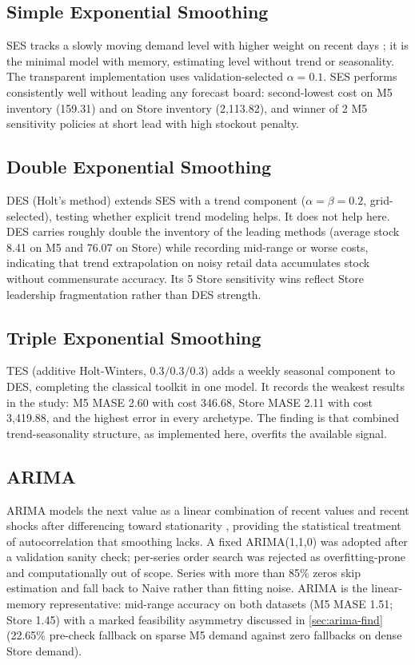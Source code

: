 \subsection{Simple Exponential Smoothing}
\label{sec:m-ses}
SES tracks a slowly moving demand level with higher weight on recent days
\citep{hyndman2018}; it is the minimal model with memory, estimating level
without trend or seasonality. The transparent implementation uses
validation-selected $\alpha=0.1$. SES performs consistently well without
leading any forecast board: second-lowest cost on M5 inventory (159.31) and
on Store inventory (2,113.82), and winner of 2 M5 sensitivity policies at
short lead with high stockout penalty.

\subsection{Double Exponential Smoothing}
\label{sec:m-des}
DES (Holt's method) extends SES with a trend component
($\alpha=\beta=0.2$, grid-selected), testing whether explicit trend modeling
helps. It does not help here. DES carries roughly double the inventory of the
leading methods (average stock 8.41 on M5 and 76.07 on Store) while recording
mid-range or worse costs, indicating that trend extrapolation on noisy retail
data accumulates stock without commensurate accuracy. Its 5 Store sensitivity
wins reflect Store leadership fragmentation rather than DES strength.

\subsection{Triple Exponential Smoothing}
\label{sec:m-tes}
TES (additive Holt-Winters, $0.3/0.3/0.3$) adds a weekly seasonal component to
DES, completing the classical toolkit in one model. It records the weakest
results in the study: M5 MASE 2.60 with cost 346.68, Store MASE 2.11 with cost
3,419.88, and the highest error in every archetype. The finding is that
combined trend-seasonality structure, as implemented here, overfits the
available signal.

\subsection{ARIMA}
\label{sec:m-arima}
ARIMA models the next value as a linear combination of recent values and
recent shocks after differencing toward stationarity
\citep{box1970,hyndman2018}, providing the statistical treatment of
autocorrelation that smoothing lacks. A fixed ARIMA(1,1,0) was adopted after
a validation sanity check; per-series order search was rejected as
overfitting-prone and computationally out of scope. Series with more than 85\%
zeros skip estimation and fall back to Naive rather than fitting noise. ARIMA
is the linear-memory representative: mid-range accuracy on both datasets (M5
MASE 1.51; Store 1.45) with a marked feasibility asymmetry discussed in
\cref{sec:arima-find} (22.65\% pre-check fallback on sparse M5 demand against
zero fallbacks on dense Store demand).

